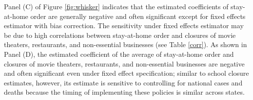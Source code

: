 \documentclass[11pt,reqno,letter]{amsart}
\theoremstyle{definition}
\begin{document}
Panel (C) of Figure  \ref{fig:whisker} indicates that the estimated coefficients of stay-at-home order  are generally negative and often significant 
 except for fixed effects estimator with bias correction. The sensitivity under fixed effects estimator may be due to high correlations between stay-at-home order  and closures of movie theaters, restaurants, and non-essential businesses (see Table \ref{corr}). As shown in Panel (D), the  estimated coefficient of the average of  stay-at-home order  and closures of movie theaters, restaurants, and non-essential businesses   are  negative and often significant even under fixed effect specification; similar to school closure estimates, however,  its estimate is sensitive to controlling for national cases and deaths because the timing of implementing these policies is similar across states.
 
\end{document}
